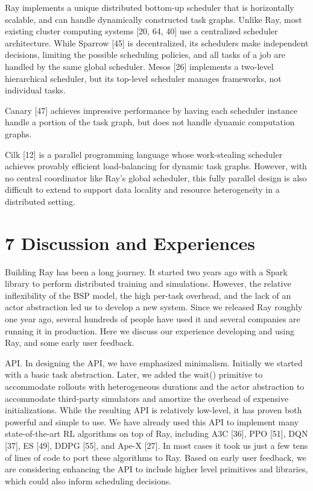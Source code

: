 \documentclass[
]{article}
\begin{document}
Ray implements a unique distributed bottom-up scheduler that is
horizontally scalable, and can handle dynamically constructed task
graphs. Unlike Ray, most existing cluster computing systems {[}20, 64,
40{]} use a centralized scheduler architecture. While Sparrow {[}45{]}
is decentralized, its schedulers make independent decisions, limiting
the possible scheduling policies, and all tasks of a job are handled by
the same global scheduler. Mesos {[}26{]} implements a two-level
hierarchical scheduler, but its top-level scheduler manages frameworks,
not individual tasks.

Canary {[}47{]} achieves impressive performance by having each scheduler
instance handle a portion of the task graph, but does not handle dynamic
computation graphs.

Cilk {[}12{]} is a parallel programming language whose work-stealing
scheduler achieves provably efficient load-balancing for dynamic task
graphs. However, with no central coordinator like Ray's global
scheduler, this fully parallel design is also difficult to extend to
support data locality and resource heterogeneity in a distributed
setting.

\section{7 Discussion and Experiences}\label{discussion-and-experiences}

Building Ray has been a long journey. It started two years ago with a
Spark library to perform distributed training and simulations. However,
the relative inflexibility of the BSP model, the high per-task overhead,
and the lack of an actor abstraction led us to develop a new system.
Since we released Ray roughly one year ago, several hundreds of people
have used it and several companies are running it in production. Here we
discuss our experience developing and using Ray, and some early user
feedback.

API. In designing the API, we have emphasized minimalism. Initially we
started with a basic task abstraction. Later, we added the wait()
primitive to accommodate rollouts with heterogeneous durations and the
actor abstraction to accommodate third-party simulators and amortize the
overhead of expensive initializations. While the resulting API is
relatively low-level, it has proven both powerful and simple to use. We
have already used this API to implement many state-of-the-art RL
algorithms on top of Ray, including A3C {[}36{]}, PPO {[}51{]}, DQN
{[}37{]}, ES {[}49{]}, DDPG {[}55{]}, and Ape-X {[}27{]}. In most cases
it took us just a few tens of lines of code to port these algorithms to
Ray. Based on early user feedback, we are considering enhancing the API
to include higher level primitives and libraries, which could also
inform scheduling decisions.
\end{document}

